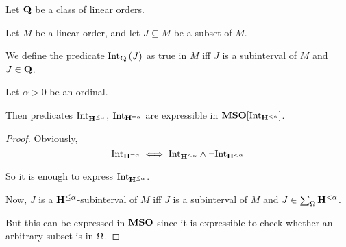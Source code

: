 
\begin{definition}
  Let $\mathbf{Q}$ be a class of linear orders.

  Let $M$ be a linear order, and let $J \subseteq M$ be a subset of $M$.

  We define the predicate $\mathrm{Int}_{\mathbf{Q}} \left( {J} \right)$ as
  true in $M$ iff $J$ is a subinterval of $M$ and
  $J \in \mathbf{Q}$.
\end{definition}

\begin{lemma}
  Let $\alpha > 0$ be an ordinal.

  Then predicates $\mathrm{Int}_{\mathbf{H}^{\le \alpha}}$, $\mathrm{Int}_{\mathbf{H}^{= \alpha}}$
  are expressible in $\mathbf{MSO}[\mathrm{Int}_{\mathbf{H}^{< \alpha}}]$.
\end{lemma}

\begin{proof}
  Obviously, \[
    \mathrm{Int}_{\mathbf{H}^{= \alpha}}
    \iff \mathrm{Int}_{\mathbf{H}^{\le \alpha}} \wedge \neg \mathrm{Int}_{\mathbf{H}^{< \alpha}}
  \]

  So it is enough to express $\mathrm{Int}_{\mathbf{H}^{\le \alpha}}$.

  Now, $J$ is a $\mathbf{H}^{\le \alpha}$-subinterval of $M$ iff
  $J$ is a subinterval of $M$ and $J \in \sum_{\Omega}{\mathbf{H}^{< \alpha}}$.

  But this can be expressed in $\mathbf{MSO}$ since it is expressible
  to check whether an arbitrary subset is in $\Omega$.
\end{proof}

